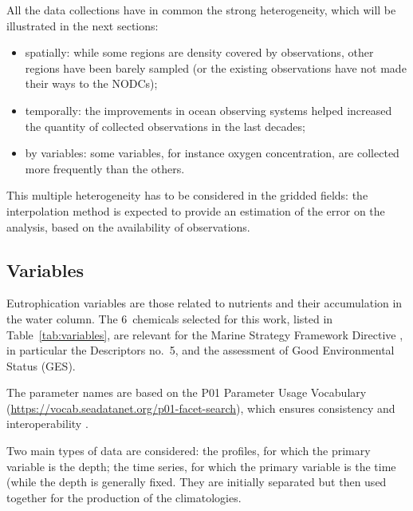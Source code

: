 \documentclass[essd,manuscript]{copernicus}
\begin{document}
All the data collections have in common the strong heterogeneity, which will be illustrated in the next sections: 
\begin{itemize}
\item spatially: while some regions are density covered by observations, other regions have been barely sampled (or the existing observations have not made their ways to the NODCs);
\item temporally: the improvements in ocean observing systems helped increased the quantity of collected observations in the last decades;
\item by variables: some variables, for instance oxygen concentration, are collected more frequently than the others.
\end{itemize}
This multiple heterogeneity has to be considered in the gridded fields: the interpolation method is expected to provide an estimation of the error on the analysis, based on the availability of observations. 


\subsection{Variables\label{sec:variables}}

Eutrophication variables are those related to nutrients and their accumulation in the water column. The 6~chemicals selected for this work, listed in Table~\ref{tab:variables}, are relevant for the Marine Strategy Framework Directive \citep[MSFD,][]{EURO2008}, in particular the Descriptors no.~5, and the assessment of Good Environmental Status (GES). 

The parameter names are based on the P01 Parameter Usage Vocabulary (\url{https://vocab.seadatanet.org/p01-facet-search}), which ensures consistency and interoperability \citep{iocmanualsguides54}. 

Two main types of data are considered: the profiles, for which the primary variable is the depth; the time series, for which the primary variable is the time (while the depth is generally fixed. They are initially separated but then used together for the production of the climatologies. 
\end{document}
